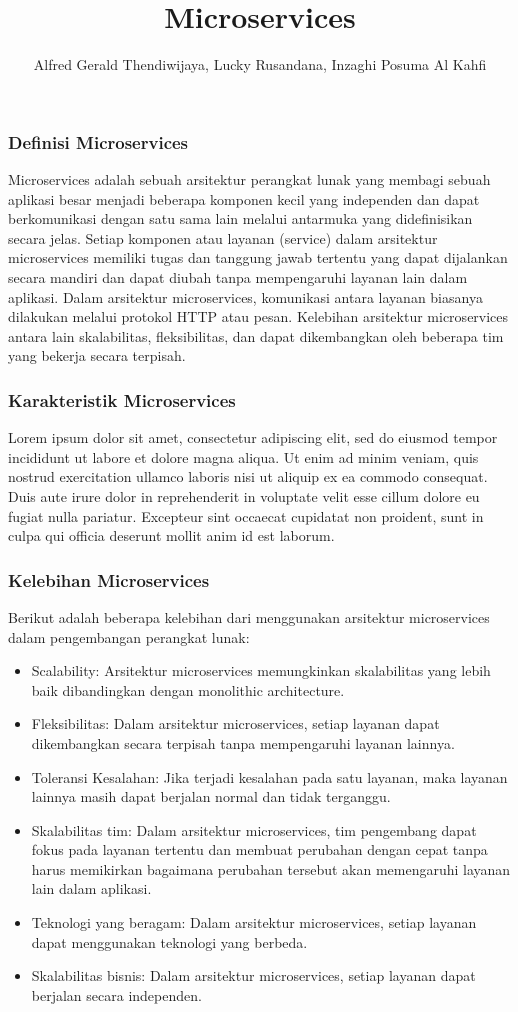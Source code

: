 \documentclass{beamer}
\title{Microservices}
\author{Alfred Gerald Thendiwijaya, Lucky Rusandana, Inzaghi Posuma Al Kahfi}
\begin{document}
	
	\frame{\titlepage}
	
	\begin{frame}
		\frametitle{Definisi Microservices}
		Microservices adalah sebuah arsitektur perangkat lunak yang membagi sebuah aplikasi besar menjadi beberapa komponen kecil yang independen dan dapat berkomunikasi dengan satu sama lain melalui antarmuka yang didefinisikan secara jelas. Setiap komponen atau layanan (service) dalam arsitektur microservices memiliki tugas dan tanggung jawab tertentu yang dapat dijalankan secara mandiri dan dapat diubah tanpa mempengaruhi layanan lain dalam aplikasi. Dalam arsitektur microservices, komunikasi antara layanan biasanya dilakukan melalui protokol HTTP atau pesan. Kelebihan arsitektur microservices antara lain skalabilitas, fleksibilitas, dan dapat dikembangkan oleh beberapa tim yang bekerja secara terpisah.
	\end{frame}
	
	\begin{frame}
		\frametitle{Karakteristik Microservices}
		Lorem ipsum dolor sit amet, consectetur adipiscing elit, sed do eiusmod tempor incididunt ut labore et dolore magna aliqua. Ut enim ad minim veniam, quis nostrud exercitation ullamco laboris nisi ut aliquip ex ea commodo consequat. Duis aute irure dolor in reprehenderit in voluptate velit esse cillum dolore eu fugiat nulla pariatur. Excepteur sint occaecat cupidatat non proident, sunt in culpa qui officia deserunt mollit anim id est laborum.
	\end{frame}
	
	\begin{frame}
		\frametitle{Kelebihan Microservices}
		Berikut adalah beberapa kelebihan dari menggunakan arsitektur microservices dalam pengembangan perangkat lunak:
		\begin{itemize}
			\item Scalability: Arsitektur microservices memungkinkan skalabilitas yang lebih baik dibandingkan dengan monolithic architecture.
			\item Fleksibilitas: Dalam arsitektur microservices, setiap layanan dapat dikembangkan secara terpisah tanpa mempengaruhi layanan lainnya.
			\item Toleransi Kesalahan: Jika terjadi kesalahan pada satu layanan, maka layanan lainnya masih dapat berjalan normal dan tidak terganggu.
			\item Skalabilitas tim: Dalam arsitektur microservices, tim pengembang dapat fokus pada layanan tertentu dan membuat perubahan dengan cepat tanpa harus memikirkan bagaimana perubahan tersebut akan memengaruhi layanan lain dalam aplikasi.
			\item Teknologi yang beragam: Dalam arsitektur microservices, setiap layanan dapat menggunakan teknologi yang berbeda.
			\item Skalabilitas bisnis: Dalam arsitektur microservices, setiap layanan dapat berjalan secara independen.
		\end{itemize}
	\end{frame}
	
\end{document}
